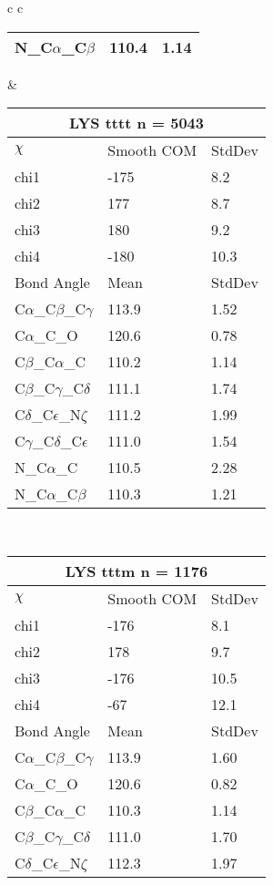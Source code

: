 \begin{longtable}{ c c }
\begin{tabular}{ l l l }
  N\_C$\alpha$\_C$\beta$ & 110.4 & 1.14\\
  \bottomrule
  \end{tabular}
  &
  \begin{tabular}{ l l l }
  \toprule
  \multicolumn{3}{c}{LYS \textbf{tttt} n = 5043} \\ \toprule
  $\chi$       & Smooth COM & StdDev \\ \midrule
  chi1 & -175 & 8.2 \\ 
  chi2 & 177 & 8.7 \\ 
  chi3 & 180 & 9.2 \\ 
  chi4 & -180 & 10.3 \\ \midrule
  Bond Angle   & Mean     & StdDev \\ \midrule
  C$\alpha$\_C$\beta$\_C$\gamma$ & 113.9 & 1.52\\
  C$\alpha$\_C\_O & 120.6 & 0.78\\
  C$\beta$\_C$\alpha$\_C & 110.2 & 1.14\\
  C$\beta$\_C$\gamma$\_C$\delta$ & 111.1 & 1.74\\
  C$\delta$\_C$\epsilon$\_N$\zeta$ & 111.2 & 1.99\\
  C$\gamma$\_C$\delta$\_C$\epsilon$ & 111.0 & 1.54\\
  N\_C$\alpha$\_C & 110.5 & 2.28\\
  N\_C$\alpha$\_C$\beta$ & 110.3 & 1.21\\
  \bottomrule
  \end{tabular}
  \\
  \begin{tabular}{ l l l }
  \toprule
  \multicolumn{3}{c}{LYS \textbf{tttm} n = 1176} \\ \toprule
  $\chi$       & Smooth COM & StdDev \\ \midrule
  chi1 & -176 & 8.1 \\ 
  chi2 & 178 & 9.7 \\ 
  chi3 & -176 & 10.5 \\ 
  chi4 & -67 & 12.1 \\ \midrule
  Bond Angle   & Mean     & StdDev \\ \midrule
  C$\alpha$\_C$\beta$\_C$\gamma$ & 113.9 & 1.60\\
  C$\alpha$\_C\_O & 120.6 & 0.82\\
  C$\beta$\_C$\alpha$\_C & 110.3 & 1.14\\
  C$\beta$\_C$\gamma$\_C$\delta$ & 111.0 & 1.70\\
  C$\delta$\_C$\epsilon$\_N$\zeta$ & 112.3 & 1.97\\

\end{tabular}
\end{longtable}
